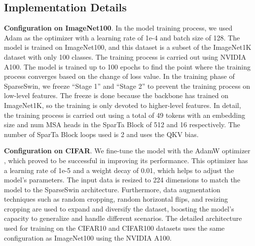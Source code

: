 \documentclass[runningheads]{llncs}
\begin{document}
\subsection{Implementation Details}
\label{sec:Implementation_Details}
\textbf{Configuration on ImageNet100}. In the model training process, we used Adam \cite{kingma2014adam} as the optimizer with a learning rate of 1e-4 and batch size of 128. The model is trained on ImageNet100, and this dataset is a subset of the ImageNet1K dataset with only 100 classes. The training process is carried out using NVIDIA A100. The model is trained up to 100 epochs to find the point where the training process converges based on the change of loss value. In the training phase of SparseSwin, we freeze “Stage 1” and “Stage 2” to prevent the training process on low-level features. The freeze is done because the backbone has trained on ImageNet1K, so the training is only devoted to higher-level features. In detail, the training process is carried out using a total of 49 tokens with an embedding size and num MSA heads in the SparTa Block of 512 and 16 respectively. The number of SparTa Block loops used is 2 and uses the QKV bias.

\textbf{Configuration on CIFAR}. We fine-tune the model with the AdamW optimizer \cite{loshchilov2017decoupled}, which proved to be successful in improving its performance. This optimizer has a learning rate of 1e-5 and a weight decay of 0.01, which helps to adjust the model's parameters. The input data is resized to 224 dimensions to match the model to the SparseSwin architecture. Furthermore, data augmentation techniques such as random cropping, random horizontal flips, and resizing cropping are used to expand and diversify the dataset, boosting the model's capacity to generalize and handle different scenarios. The detailed architecture used for training on the CIFAR10 and CIFAR100 datasets uses the same configuration as ImageNet100 using the NVIDIA A100.
\end{document}
